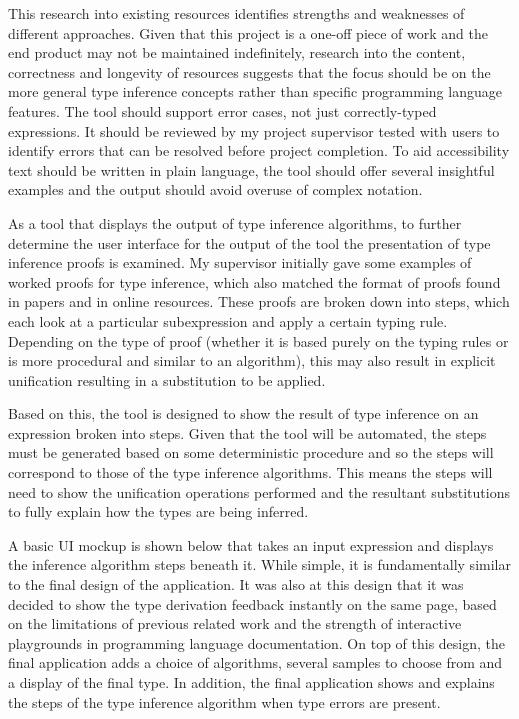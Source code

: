 \documentclass[a4paper,fleqn,oneside,12pt]{report}
\begin{document}
This research into existing resources identifies strengths and weaknesses of different approaches. Given that this project is a one-off piece of work and the end product may not be maintained indefinitely, research into the content, correctness and longevity of resources suggests that the focus should be on the more general type inference concepts rather than specific programming language features. The tool should support error cases, not just correctly-typed expressions. It should be reviewed by my project supervisor tested with users to identify errors that can be resolved before project completion. To aid accessibility text should be written in plain language, the tool should offer several insightful examples and the output should avoid overuse of complex notation.

As a tool that displays the output of type inference algorithms, to further determine the user interface for the output of the tool the presentation of type inference proofs is examined. My supervisor initially gave some examples of worked proofs for type inference, which also matched the format of proofs found in papers and in online resources. These proofs are broken down into steps, which each look at a particular subexpression and apply a certain typing rule. Depending on the type of proof (whether it is based purely on the typing rules or is more procedural and similar to an algorithm), this may also result in explicit unification resulting in a substitution to be applied.

Based on this, the tool is designed to show the result of type inference on an expression broken into steps. Given that the tool will be automated, the steps must be generated based on some deterministic procedure and so the steps will correspond to those of the type inference algorithms. This means the steps will need to show the unification operations performed and the resultant substitutions to fully explain how the types are being inferred.

A basic UI mockup is shown below that takes an input expression and displays the inference algorithm steps beneath it. While simple, it is fundamentally similar to the final design of the application. It was also at this design that it was decided to show the type derivation feedback instantly on the same page, based on the limitations of previous related work and the strength of interactive playgrounds in programming language documentation. On top of this design, the final application adds a choice of algorithms, several samples to choose from and a display of the final type. In addition, the final application shows and explains the steps of the type inference algorithm when type errors are present.
\end{document}
